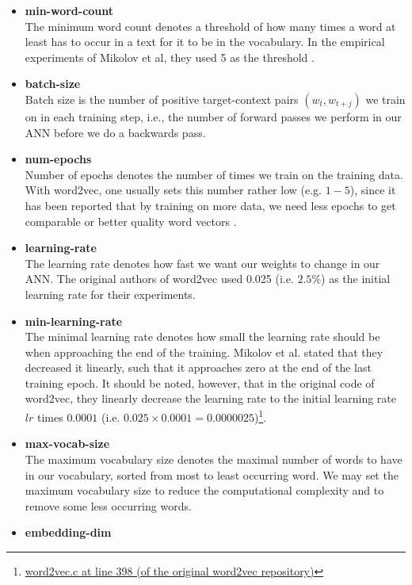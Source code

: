 \begin{itemize}
    \item \textbf{min-word-count} \\
        The minimum word count denotes a threshold of how many times a word at least has to occur in a text for it to be in the vocabulary. In the empirical experiments of Mikolov et al, they used 5 as the threshold \cite{mikolov2013b}.
    \item \textbf{batch-size} \\
        Batch size is the number of positive target-context pairs $(w_t, w_{t+j})$ we train on in each training step, i.e., the number of forward passes we perform in our ANN before we do a backwards pass.
    \item \textbf{num-epochs} \\
        Number of epochs denotes the number of times we train on the training data. With word2vec, one usually sets this number rather low (e.g. $1-5$), since it has been reported that by training on more data, we need less epochs to get comparable or better quality word vectors \cite{mikolov2013a}.
    \item \textbf{learning-rate} \\
        The learning rate denotes how fast we want our weights to change in our ANN. The original authors of word2vec used 0.025 (i.e. $2.5\%$) as the initial learning rate for their experiments.
    \item \textbf{min-learning-rate} \\
        The minimal learning rate denotes how small the learning rate should be when approaching the end of the training. Mikolov et al. stated that they decreased it linearly, such that it approaches zero at the end of the last training epoch. It should be noted, however, that in the original code of word2vec, they linearly decrease the learning rate to the initial learning rate $lr$ times $0.0001$ (i.e. $0.025 \times 0.0001 = 0.0000025$)\footnote{\href{https://github.com/tmikolov/word2vec/blob/e092540633572b883e25b367938b0cca2cf3c0e7/word2vec.c\#L398}{word2vec.c at line 398 (of the original word2vec repository)}}.
    \item \textbf{max-vocab-size} \\
        The maximum vocabulary size denotes the maximal number of words to have in our vocabulary, sorted from most to least occurring word. We may set the maximum vocabulary size to reduce the computational complexity and to remove some less occurring words.
    \item \textbf{embedding-dim} \\

\end{itemize}
